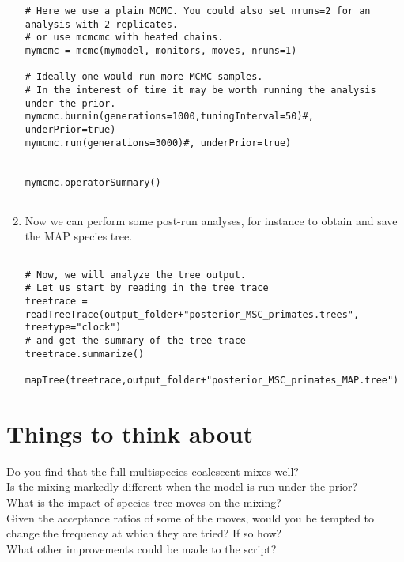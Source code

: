 \begin{enumerate}
{\begin{snugshade*}
\begin{lstlisting}
# Here we use a plain MCMC. You could also set nruns=2 for an analysis with 2 replicates.
# or use mcmcmc with heated chains.
mymcmc = mcmc(mymodel, monitors, moves, nruns=1)

# Ideally one would run more MCMC samples.
# In the interest of time it may be worth running the analysis under the prior.
mymcmc.burnin(generations=1000,tuningInterval=50)#, underPrior=true)
mymcmc.run(generations=3000)#, underPrior=true)


mymcmc.operatorSummary()


\end{lstlisting}
\end{snugshade*}}

\item Now we can perform some post-run analyses, for instance to obtain and save the MAP species tree.
{\tt \begin{snugshade*}
\begin{lstlisting}

# Now, we will analyze the tree output.
# Let us start by reading in the tree trace
treetrace = readTreeTrace(output_folder+"posterior_MSC_primates.trees", treetype="clock")
# and get the summary of the tree trace
treetrace.summarize()

mapTree(treetrace,output_folder+"posterior_MSC_primates_MAP.tree")

\end{lstlisting}
\end{snugshade*}}

\end{enumerate}



\section{Things to think about}
Do you find that the full multispecies coalescent mixes well?\\
Is the mixing markedly different when the model is run under the prior?\\
What is the impact of species tree moves on the mixing?\\
Given the acceptance ratios of some of the moves, would you be tempted to change the frequency at which they are tried? If so how?\\
What other improvements could be made to the script?





